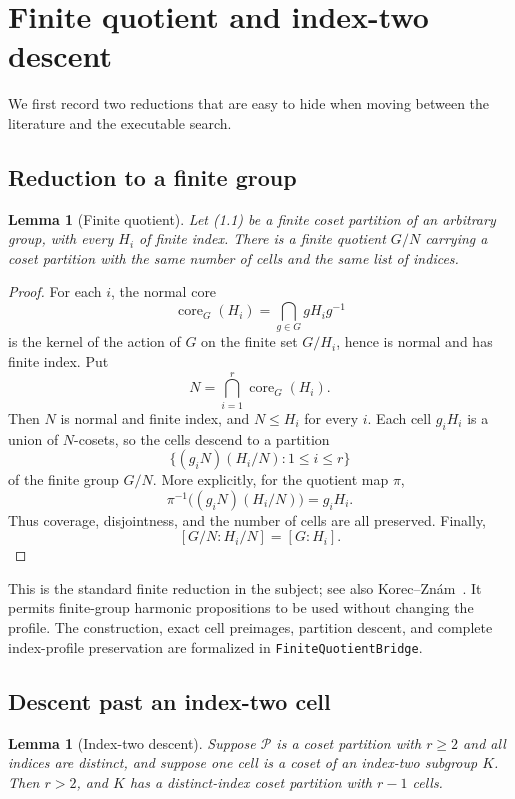 \documentclass[11pt]{article}
\newtheorem{lemma}[theorem]{Lemma}
\theoremstyle{definition}
\newcommand{\leanname}[1]{\nolinkurl{#1}}
\begin{document}
\section{Finite quotient and index-two descent}\label{sec:group}

We first record two reductions that are easy to hide when moving between the
literature and the executable search.

\subsection{Reduction to a finite group}

\begin{lemma}[Finite quotient]\label{lem:finite-quotient}
Let \emph{(1.1)} be a finite coset partition of an arbitrary group, with every
$H_i$ of finite index. There is a finite quotient $G/N$ carrying a coset
partition with the same number of cells and the same list of indices.
\end{lemma}

\begin{proof}
For each $i$, the normal core
\[
  \operatorname{core}_G(H_i)=\bigcap_{g\in G}gH_ig^{-1}
\]
is the kernel of the action of $G$ on the finite set $G/H_i$, hence is normal
and has finite index. Put
\[
  N=\bigcap_{i=1}^r\operatorname{core}_G(H_i).
\]
Then $N$ is normal and finite index, and $N\leq H_i$ for every $i$. Each cell
$g_iH_i$ is a union of $N$-cosets, so the cells descend to a partition
\[
  \{(g_iN)(H_i/N):1\leq i\leq r\}
\]
of the finite group $G/N$. More explicitly, for the quotient map $\pi$,
\[
  \pi^{-1}\bigl((g_iN)(H_i/N)\bigr)=g_iH_i.
\]
Thus coverage, disjointness, and the number of cells are all preserved.
Finally,
\[
  [G/N:H_i/N]=[G:H_i].
\]
\end{proof}

This is the standard finite reduction in the subject; see also
Korec--Zn\'am~\cite{KZ77}. It permits finite-group harmonic propositions to
be used without changing the profile. The construction, exact cell preimages,
partition descent, and complete index-profile preservation are formalized in
\leanname{FiniteQuotientBridge}.

\subsection{Descent past an index-two cell}

\begin{lemma}[Index-two descent]\label{lem:index-two}
Suppose $\mathcal P$ is a coset partition with $r\geq2$ and all indices are
distinct, and suppose one cell is a coset of an index-two subgroup $K$.
Then $r>2$, and $K$ has a distinct-index coset partition with $r-1$ cells.
\end{lemma}
\end{document}
